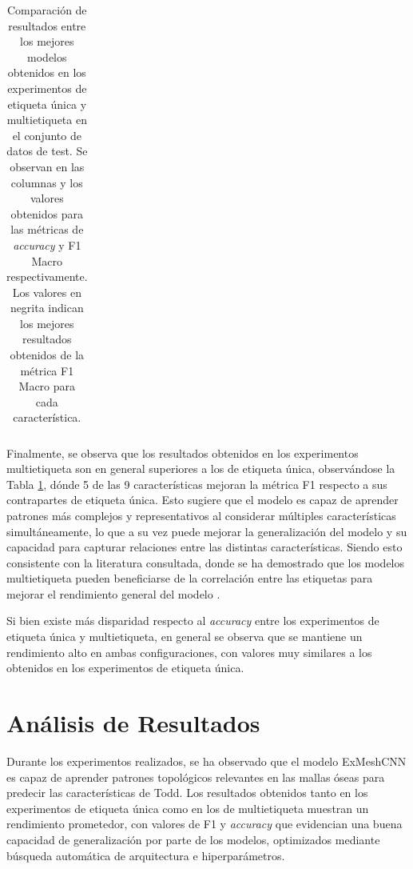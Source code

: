 \begin{table}[h]
\begin{tabular}{|c|cc|cc|}
    \end{tabular}
    \caption[Comparación de resultados entre los mejores modelos obtenidos en los experimentos de etiqueta única y multietiqueta]{Comparación de resultados entre los mejores modelos obtenidos en los experimentos de etiqueta única y multietiqueta en el conjunto de datos de test. Se observan en las columnas  y  los valores obtenidos para las métricas de \textit{accuracy} y F1 Macro respectivamente. Los valores en negrita indican los mejores resultados obtenidos de la métrica F1 Macro para cada característica.}
    \label{table5:multilabel_comparison}
\end{table}

Finalmente, se observa que los resultados obtenidos en los experimentos multietiqueta son en general superiores a los de etiqueta única, observándose la Tabla \ref{table5:multilabel_comparison}, dónde 5 de las 9 características mejoran la métrica F1 respecto a sus contrapartes de etiqueta única. Esto sugiere que el modelo es capaz de aprender patrones más complejos y representativos al considerar múltiples características simultáneamente, lo que a su vez puede mejorar la generalización del modelo y su capacidad para capturar relaciones entre las distintas características. Siendo esto consistente con la literatura consultada, donde se ha demostrado que los modelos multietiqueta pueden beneficiarse de la correlación entre las etiquetas para mejorar el rendimiento general del modelo \cite{ranjan_hyperface_2019}.

Si bien existe más disparidad respecto al \textit{accuracy} entre los experimentos de etiqueta única y multietiqueta, en general se observa que se mantiene un rendimiento alto en ambas configuraciones, con valores muy similares a los obtenidos en los experimentos de etiqueta única.

\section{Análisis de Resultados}

Durante los experimentos realizados, se ha observado que el modelo ExMeshCNN es capaz de aprender patrones topológicos relevantes en las mallas óseas para predecir las características de Todd. Los resultados obtenidos tanto en los experimentos de etiqueta única como en los de multietiqueta muestran un rendimiento prometedor, con valores de F1 y \textit{accuracy} que evidencian una buena capacidad de generalización por parte de los modelos, optimizados mediante búsqueda automática de arquitectura e hiperparámetros.

